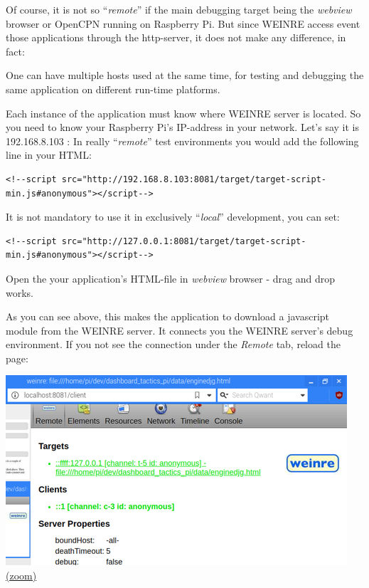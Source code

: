 \documentclass[11pt]{article}
\begin{document}
    Of course, it is not so ``\emph{remote}'' if the main debugging target
being the \emph{webview} browser or OpenCPN running on Raspberry Pi. But
since WEINRE access event those applications through the http-server, it
does not make any difference, in fact:

    One can have multiple hosts used at the same time, for testing and
debugging the same application on different run-time platforms.

    Each instance of the application must know where WEINRE server is
located. So you need to know your Raspberry Pi's IP-address in your
network. Let's say it is 192.168.8.103 : In really ``\emph{remote}''
test environments you would add the following line in your HTML:

    \begin{verbatim}
<!--script src="http://192.168.8.103:8081/target/target-script-min.js#anonymous"></script-->
\end{verbatim}

    It is not mandatory to use it in exclusively ``\emph{local}''
development, you can set:

    \begin{verbatim}
<!--script src="http://127.0.0.1:8081/target/target-script-min.js#anonymous"></script-->
\end{verbatim}

    Open the your application's HTML-file in \emph{webview} browser - drag
and drop works.

    As you can see above, this makes the application to download a
javascript module from the WEINRE server. It connects you the WEINRE
server's debug environment. If you not see the connection under the
\emph{Remote} tab, reload the page:

    \includegraphics{2019-12-25_weinre_server_connected_to_local_host_client.png}
\href{pdf/2019-12-25_weinre_server_connected_to_local_host_client.png}{(zoom)}
\end{document}
